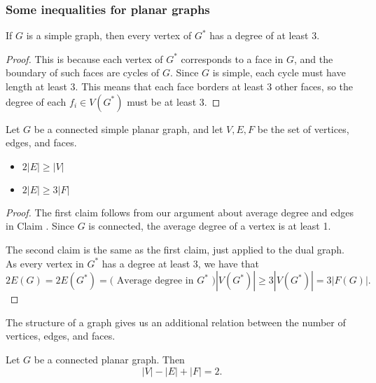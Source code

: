\subsubsection{Some inequalities for planar graphs}
\begin{claim}
If $G$ is a simple graph, then every vertex of $G^*$ has a degree of at least 3.
\end{claim}
\begin{proof}
This is because each vertex of $G^*$ corresponds to a face in $G$, and the boundary of such faces are cycles of $G$. Since $G$ is simple, each cycle must have length at least 3. This means that each face borders at least 3 other faces, so the degree of each $f_i\in V(G^*)$ must be at least 3. 
\end{proof}
\begin{claim}
 Let $G$ be a connected simple planar graph, and let $V, E, F$ be the set of vertices, edges, and faces. 
 \begin{itemize}
  \item $2|E|\geq |V|$
  \item $2|E|\geq 3|F|$
 \end{itemize}
\end{claim}
\begin{proof}
 The first claim follows from our argument about average degree and edges in Claim . Since $G$ is connected, the average degree of a vertex is at least 1. 

 The second claim is the same as the first claim, just applied to the dual graph. As every vertex in $G^*$ has a degree at least 3, we have that 
 \[2E(G)=2E(G^*)=(\text{ Average degree in $G^*$ )}|V(G^*)|\geq 3|V(G^*)|= 3|F(G)|.\] 

\end{proof}
The structure of a graph gives us an additional relation between the number of vertices, edges, and faces. 
\begin{theorem}
Let $G$ be a connected planar graph. Then
  \[|V|-|E|+|F|=2.\]
  \label{thm:eulersformula}
\end{theorem}
